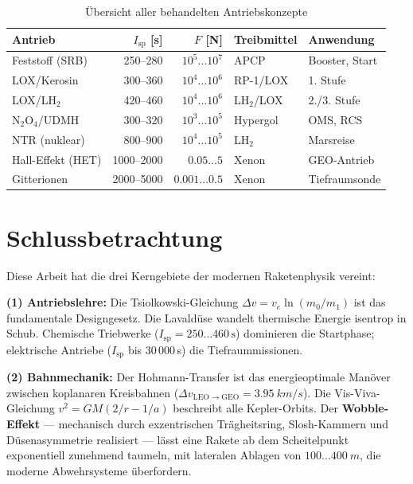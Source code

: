﻿\documentclass[12pt,a4paper]{article}
\newcommand{\Isp}{I_{\mathrm{sp}}}
\newcommand{\Dv}{\Delta v}
\begin{document}
\begin{table}[H]
\centering
\caption{Übersicht aller behandelten Antriebskonzepte}
\label{tab:uebersicht}
\begin{tabular}{lrrll}
\toprule
\textbf{Antrieb} & \textbf{$\Isp$ [s]} & \textbf{$F$ [N]} &
\textbf{Treibmittel} & \textbf{Anwendung}\\
\midrule
Feststoff (SRB)   & 250--280  & $10^5\ldots10^7$ & APCP     & Booster, Start\\
LOX/Kerosin       & 300--360  & $10^4\ldots10^6$ & RP-1/LOX & 1. Stufe\\
LOX/LH$_2$        & 420--460  & $10^4\ldots10^6$ & LH$_2$/LOX& 2./3. Stufe\\
N$_2$O$_4$/UDMH   & 300--320  & $10^3\ldots10^5$ & Hypergol & OMS, RCS\\
NTR (nuklear)     & 800--900  & $10^4\ldots10^5$ & LH$_2$   & Marsreise\\
Hall-Effekt (HET) & 1000--2000 & $0.05\ldots5$   & Xenon    & GEO-Antrieb\\
Gitterionen       & 2000--5000 & $0.001\ldots0.5$& Xenon    & Tiefraumsonde\\
\bottomrule
\end{tabular}
\end{table}

\section{Schlussbetrachtung}

Diese Arbeit hat die drei Kerngebiete der modernen Raketenphysik vereint:

\textbf{(1) Antriebslehre:} Die Tsiolkowski-Gleichung $\Dv = v_e\ln(m_0/m_1)$ ist
das fundamentale Designgesetz. Die Lavaldüse wandelt thermische Energie isentrop
in Schub. Chemische Triebwerke ($\Isp=250\ldots460\,\mathrm{s}$) dominieren die
Startphase; elektrische Antriebe ($\Isp$ bis 30\,000\,s) die Tiefraummissionen.

\textbf{(2) Bahnmechanik:} Der Hohmann-Transfer ist das energieoptimale Manöver
zwischen koplanaren Kreisbahnen ($\Dv_{\mathrm{LEO}\to\mathrm{GEO}} = \SI{3.95}{km/s}$).
Die Vis-Viva-Gleichung $v^2 = GM(2/r - 1/a)$ beschreibt alle Kepler-Orbits.
Der \textbf{Wobble-Effekt} --- mechanisch durch exzentrischen Trägheitsring,
Slosh-Kammern und Düsenasymmetrie realisiert --- lässt eine Rakete ab dem
Scheitelpunkt exponentiell zunehmend taumeln, mit lateralen Ablagen von
$100\ldots\SI{400}{m}$, die moderne Abwehrsysteme überfordern.
\end{document}
